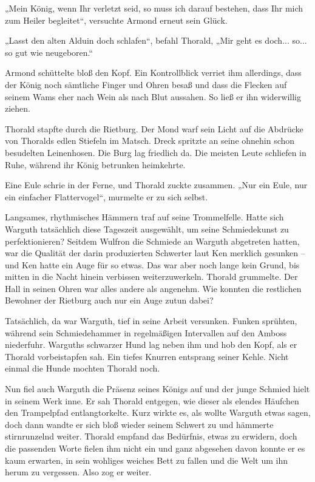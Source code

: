 \documentclass[10pt, a4paper, oneside]{book}
\begin{document}
„Mein König, wenn Ihr verletzt seid, so muss ich darauf bestehen, dass Ihr mich zum Heiler begleitet“, versuchte Armond erneut sein Glück.

„Lasst den alten Alduin doch schlafen“, befahl Thorald, „Mir geht es doch... so... so gut wie neugeboren.“

Armond schüttelte bloß den Kopf. Ein Kontrollblick verriet ihm allerdings, dass der König noch sämtliche Finger und Ohren besaß und dass die Flecken auf seinem Wams eher nach Wein als nach Blut aussahen. So ließ er ihn widerwillig ziehen.\bigskip







Thorald stapfte durch die Rietburg. Der Mond warf sein Licht auf die Abdrücke von Thoralds edlen Stiefeln im Matsch. Dreck spritzte an seine ohnehin schon besudelten Leinenhosen. Die Burg lag friedlich da. Die meisten Leute schliefen in Ruhe, während ihr König betrunken heimkehrte.

Eine Eule schrie in der Ferne, und Thorald zuckte zusammen. „Nur ein Eule, nur ein einfacher Flattervogel“, murmelte er zu sich selbst.

Langsames, rhythmisches Hämmern traf auf seine Trommelfelle. Hatte sich Warguth tatsächlich diese Tageszeit ausgewählt, um seine Schmiedekunst zu perfektionieren? Seitdem Wulfron die Schmiede an Warguth abgetreten hatten, war die Qualität der darin produzierten Schwerter laut Ken merklich gesunken – und Ken hatte ein Auge für so etwas. Das war aber noch lange kein Grund, bis mitten in die Nacht hinein verbissen weiterzuwerkeln. Thorald grummelte. Der Hall in seinen Ohren war alles andere als angenehm. Wie konnten die restlichen Bewohner der Rietburg auch nur ein Auge zutun dabei?

Tatsächlich, da war Warguth, tief in seine Arbeit versunken. Funken sprühten, während sein Schmiedehammer in regelmäßigen Intervallen auf den Amboss niederfuhr. Warguths schwarzer Hund lag neben ihm und hob den Kopf, als er Thorald vorbeistapfen sah. Ein tiefes Knurren entsprang seiner Kehle. Nicht einmal die Hunde mochten Thorald noch.

Nun fiel auch Warguth die Präsenz seines Königs auf und der junge Schmied hielt in seinem Werk inne. Er sah Thorald entgegen, wie dieser als elendes Häufchen den Trampelpfad entlangtorkelte. Kurz wirkte es, als wollte Warguth etwas sagen, doch dann wandte er sich bloß wieder seinem Schwert zu und hämmerte stirnrunzelnd weiter. Thorald empfand das Bedürfnis, etwas zu erwidern, doch die passenden Worte fielen ihm nicht ein und ganz abgesehen davon konnte er es kaum erwarten, in sein wohliges weiches Bett zu fallen und die Welt um ihn herum zu vergessen. Also zog er weiter.\bigskip
\end{document}

